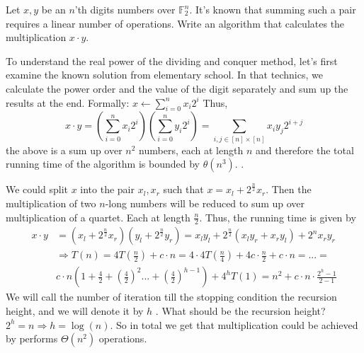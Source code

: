 

\begin{example}
Let \(x,y\) be an \(n\)'th digits numbers over \( \mathbb{F}^{n}_{2} \). It's known that summing such a pair requires a linear number of operations. Write an algorithm that calculates the multiplication \(x\cdot y\). 
\end{example}
\begin{example}
To understand the real power of the dividing and conquer method, let's first examine the known solution from elementary school.  In that technics, we calculate the power order and the value of the digit separately and sum up the results at the end. Formally: \(x \leftarrow \sum_{i=0}^{n}{x_{i}2^{i}}\) Thus, \[ x\cdot y =\left( \sum_{i=0}^{n}{x_{i}2^{i}} \right) \left( \sum_{i=0}^{n}{y_{i}2^{i}} \right) =  \sum_{i,j \in [n]\times[n] }{ x_{i}y_{j}2^{i+j} }\] the above is a sum up over \(n^2\) numbers, each at length \(n\) and therefore the total running time of the algorithm is bounded by \( \theta(n^3) \). .
\end{example}
\begin{example} We could split \(x\) into the pair \(x_{l}, x_{r}\) such that \(x = x_{l} + 2^{\frac{n}{2}}x_{r} \). Then the multiplication of two \(n\)-long numbers will be reduced to sum up over multiplication of a quartet. Each at length \(\frac{n}{2}\). Thus, the running time is given by \begin{equation*}
    \begin{split}
 x\cdot y & = \left(x_{l} + 2^{\frac{n}{2}}x_{r}\right)\left(y_{l} + 2^{\frac{n}{2}}y_{r}\right) = x_{l}y_{l} + 2^{\frac{n}{2}} \left( x_{l}y_{r} + x_{r}y_{l} \right) + 2^{n}x_{r}y_{r} \\ &  \Rightarrow T\left(n\right)  =4T\left(\frac{n}{2}\right)+c\cdot n=4\cdot4T\left(\frac{n}{4}\right)+4c\cdot\frac{n}{2}+c\cdot n = ... = \\ & c\cdot n\left(1+\frac{4}{2}+\left(\frac{4}{2}\right)^{2}...+\left(\frac{4}{2}\right)^{h-1}\right) + 4^{h}T(1) = n^{2} + c\cdot n\cdot\frac{2^{h}-1}{2-1}
    \end{split}
\end{equation*}
We will call the number of iteration till the stopping condition the recursion height, and we will denote it by \(h\) . What should be the recursion height? \( 2^{h} = n \Rightarrow h =\log\left(n\right) \). So in total we get that multiplication could be achieved by performs \( \Theta\left(n^2\right)\) operations. 
\end{example}
